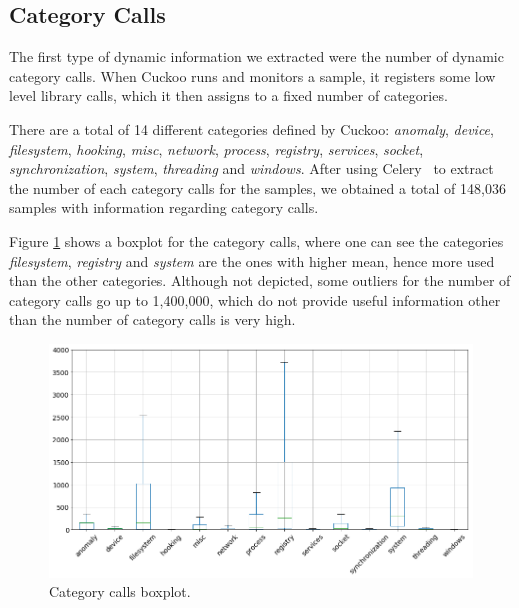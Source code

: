 \subsection{Category Calls}
\label{section:improvements_categories}

The first type of dynamic information we extracted were the number of dynamic category calls.
When Cuckoo runs and monitors a sample, it registers some low level library calls, which it then assigns to a fixed number of categories.

There are a total of 14 different categories defined by Cuckoo: \textit{anomaly}, \textit{device}, \textit{filesystem}, \textit{hooking}, \textit{misc}, \textit{network}, \textit{process}, \textit{registry}, \textit{services}, \textit{socket}, \textit{synchronization}, \textit{system}, \textit{threading} and \textit{windows}.
After using Celery~\cite{tool:celery} to extract the number of each category calls for the samples, we obtained a total of 148,036 samples with information regarding category calls.

Figure \ref{fig:boxplot_category_calls} shows a boxplot for the category calls, where one can see the categories \textit{filesystem}, \textit{registry} and \textit{system} are the ones with higher mean, hence more used than the other categories.
Although not depicted, some outliers for the number of category calls go up to 1,400,000, which do not provide useful information other than the number of category calls is very high.

\begin{figure}[!htb]
	\centering
	\includegraphics[width=\textwidth]{Figures/boxplot_category_calls.png}
	\caption{Category calls boxplot.}
	\label{fig:boxplot_category_calls}
\end{figure}

